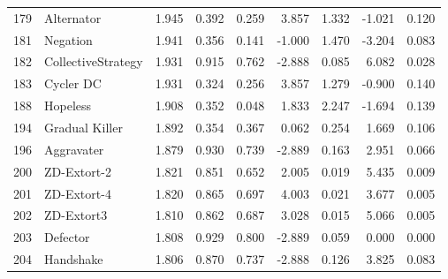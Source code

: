\begin{tabular}{rlrrrrrrr}
  179 &            Alternator &           1.945 &       0.392 &  0.259 &          3.857 &     1.332 &    -1.021 &    0.120 \\
  181 &              Negation &           1.941 &       0.356 &  0.141 &         -1.000 &     1.470 &    -3.204 &    0.083 \\
  182 &    CollectiveStrategy &           1.931 &       0.915 &  0.762 &         -2.888 &     0.085 &     6.082 &    0.028 \\
  183 &             Cycler DC &           1.931 &       0.324 &  0.256 &          3.857 &     1.279 &    -0.900 &    0.140 \\
  188 &              Hopeless &           1.908 &       0.352 &  0.048 &          1.833 &     2.247 &    -1.694 &    0.139 \\
  194 &        Gradual Killer &           1.892 &       0.354 &  0.367 &          0.062 &     0.254 &     1.669 &    0.106 \\
  196 &            Aggravater &           1.879 &       0.930 &  0.739 &         -2.889 &     0.163 &     2.951 &    0.066 \\
  200 &           ZD-Extort-2 &           1.821 &       0.851 &  0.652 &          2.005 &     0.019 &     5.435 &    0.009 \\
  201 &           ZD-Extort-4 &           1.820 &       0.865 &  0.697 &          4.003 &     0.021 &     3.677 &    0.005 \\
  202 &            ZD-Extort3 &           1.810 &       0.862 &  0.687 &          3.028 &     0.015 &     5.066 &    0.005 \\
  203 &              Defector &           1.808 &       0.929 &  0.800 &         -2.889 &     0.059 &     0.000 &    0.000 \\
  204 &             Handshake &           1.806 &       0.870 &  0.737 &         -2.888 &     0.126 &     3.825 &    0.083 \\
\bottomrule
\end{tabular}
